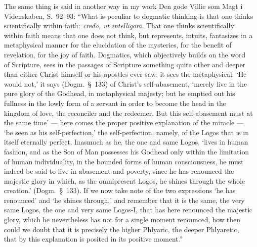 \documentclass[12pt]{book}
\newcommand{\opage}[1]{\marginnote{\footnotesize\textit{[#1]}}}
\begin{document}
The same thing is said in another way in my work Den gode Villie som Magt i
Videnskaben, S.~92--93: ``What is peculiar to dogmatic thinking is that one
thinks scientifically within faith: \textit{credo, ut intelligam.} That one
thinks scientifically within faith means that one does not think, but
represents, intuits, fantasizes in a
\opage{242}\setcounter{footnote}{0}%
metaphysical manner for the elucidation of the mysteries, for the benefit of
revelation, for the joy of faith. Dogmatics, which objectively builds on the
word of Scripture, sees in the passages of Scripture something quite other and
deeper than either Christ himself or his apostles ever saw: it sees the
metaphysical. `He would not,' it says (Dogm.\ \S~133) of Christ's
self-abasement, `merely live in the pure glory of the Godhead, in metaphysical
majesty; but he emptied out his fullness in the lowly form of a servant in
order to become the head in the kingdom of love, the reconciler and the
redeemer. But this self-abasement must at the same time' --- here comes the
proper positive explanation of the miracle --- `be seen as his
self-perfection,' the self-perfection, namely, of the Logos that is in itself
eternally perfect. Inasmuch as he, the one and same Logos, `lives in human
fashion, and as the Son of Man possesses his Godhead only within the
limitation of human individuality, in the bounded forms of human
consciousness, he must indeed be said to live in abasement and poverty, since
he has renounced the majestic glory in which, as the omnipresent Logos, he
shines through the whole creation.' (Dogm.\ \S~133). If we now take note of
the two expressions `he has renounced' and `he shines through,' and remember
that it is the same, the very same Logos, the one and very same Logos-I, that
has here renounced the majestic glory, which he nevertheless has not for a
single moment renounced, how then could we doubt that it is precisely the
higher Phlyaric, the deeper Phlyaretic, that by this explanation is posited in
its positive moment.''
\end{document}
